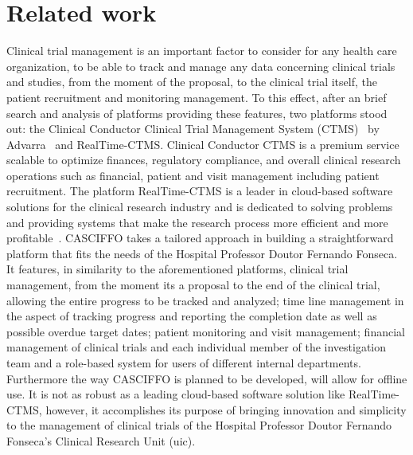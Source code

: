 \section{Related work}
Clinical trial management is an important factor to consider for any health care organization, to be able to track and manage any data concerning clinical trials and studies, from the moment of the proposal, to the clinical trial itself, the patient recruitment and monitoring management. To this effect, after an brief search and analysis of platforms providing these features, two platforms stood out: the Clinical Conductor Clinical Trial Management System (CTMS)~\cite{clinical-conductor-ctms} by Advarra~\cite{Advarra} and RealTime-CTMS. Clinical Conductor CTMS is a premium service scalable to optimize finances, regulatory compliance, and overall clinical research operations such as financial, patient and visit management including patient recruitment. The platform RealTime-CTMS is a leader in cloud-based software solutions for the clinical research industry and is dedicated to solving problems and providing systems that make the research process more efficient and more profitable~\cite{realtime-ctms}.
CASCIFFO takes a tailored approach in building a straightforward platform that fits the needs of the Hospital Professor Doutor Fernando Fonseca. It features, in similarity to the aforementioned platforms, clinical trial management, from the moment its a proposal to the end of the clinical trial, allowing the entire progress to be tracked and analyzed; time line management in the aspect of tracking progress and reporting the completion date as well as possible overdue target dates; patient monitoring and visit management; financial management of clinical trials and each individual member of the investigation team and a role-based system for users of different internal departments. Furthermore the way CASCIFFO is planned to be developed, will allow for offline use. It is not as robust as a leading cloud-based software solution like RealTime-CTMS, however, it accomplishes its purpose of bringing innovation and simplicity to the management of clinical trials of the Hospital Professor Doutor Fernando Fonseca's Clinical Research Unit (\acrlong{uic}).

